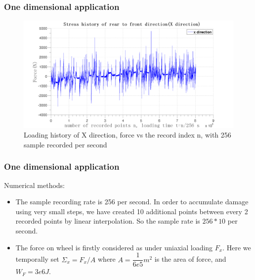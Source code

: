 \documentclass[xcolor=table]{Bredelebeamer}
\begin{document}
\begin{frame}
	\frametitle{One dimensional application}
\begin{figure}[!h]
	\centering
	\includegraphics[width=\textwidth]{figures//x.png} 
	\caption{Loading history of X direction, force vs the record index n, with 256 sample recorded per second}
	\label{x}
\end{figure}
\end{frame}	

\begin{frame}
	\frametitle{One dimensional application}
 	\begin{block}{Numerical methods:}

			\begin{itemize}
				\item 	The sample recording rate is 256 per second. In order to accumulate damage using very small steps, we have created 10 additional points between every 2 recorded points by linear interpolation. So the sample rate is $256*10$ per second.
				\vspace{6pt}
				\item The force on wheel is firstly considered as under uniaxial loading $F_x$. Here we temporally set $\Sigma_x=F_x/A$ where $A=\dfrac{1}{6e5} m^2$ is the area of force, and $W_F=3e6 J$. 
		\end{itemize}
 
	\end{block}
\end{frame}	
\end{document}
